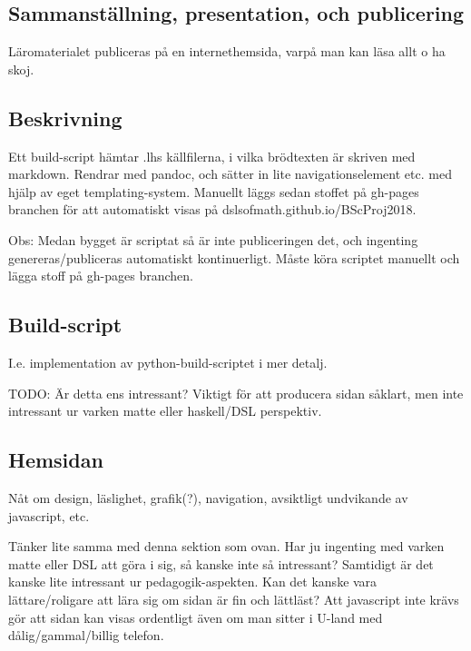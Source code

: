 \begin{binge}
  \section{Sammanställning, presentation, och publicering}

  Läromaterialet publiceras på en internethemsida, varpå man kan läsa
  allt o ha skoj.

  \subsection{Beskrivning}

  Ett build-script hämtar .lhs källfilerna, i vilka brödtexten är
  skriven med markdown. Rendrar med pandoc, och sätter in lite
  navigationselement etc. med hjälp av eget templating-system. Manuellt
  läggs sedan stoffet på gh-pages branchen för att automatiskt visas på
  dslsofmath.github.io/BScProj2018.

  Obs: Medan bygget är scriptat så är inte publiceringen det, och
  ingenting genereras/publiceras automatiskt kontinuerligt. Måste köra
  scriptet manuellt och lägga stoff på gh-pages branchen.

  \subsection{Build-script}

  I.e. implementation av python-build-scriptet i mer detalj.

  TODO: Är detta ens intressant? Viktigt för att producera sidan såklart, men
  inte intressant ur varken matte eller haskell/DSL perspektiv.

  \subsection{Hemsidan}

  Nåt om design, läslighet, grafik(?), navigation, avsiktligt undvikande
  av javascript, etc.

  Tänker lite samma med denna sektion som ovan. Har ju ingenting med
  varken matte eller DSL att göra i sig, så kanske inte så intressant?
  Samtidigt är det kanske lite intressant ur pedagogik-aspekten. Kan det
  kanske vara lättare/roligare att lära sig om sidan är fin och
  lättläst? Att javascript inte krävs gör att sidan kan visas ordentligt
  även om man sitter i U-land med dålig/gammal/billig telefon.
\end{binge}

